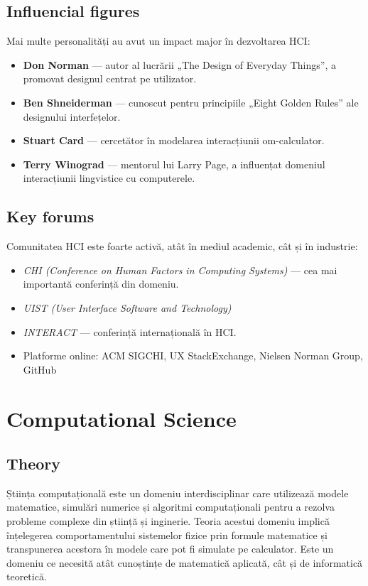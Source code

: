 \documentclass[12pt, letterpaper]{article}
\begin{document}
\subsection*{Influencial figures}
Mai multe personalități au avut un impact major în dezvoltarea HCI:
\begin{itemize}
    \item \textbf{Don Norman} — autor al lucrării „The Design of Everyday Things”, a promovat designul centrat pe utilizator.
    \item \textbf{Ben Shneiderman} — cunoscut pentru principiile „Eight Golden Rules” ale designului interfețelor.
    \item \textbf{Stuart Card} — cercetător în modelarea interacțiunii om-calculator.
    \item \textbf{Terry Winograd} — mentorul lui Larry Page, a influențat domeniul interacțiunii lingvistice cu computerele.
\end{itemize}

\subsection*{Key forums}
Comunitatea HCI este foarte activă, atât în mediul academic, cât și în industrie:
\begin{itemize}
    \item \textit{CHI (Conference on Human Factors in Computing Systems)} — cea mai importantă conferință din domeniu.
    \item \textit{UIST (User Interface Software and Technology)}
    \item \textit{INTERACT} — conferință internațională în HCI.
    \item Platforme online: ACM SIGCHI, UX StackExchange, Nielsen Norman Group, GitHub
\end{itemize}


\newpage
\section{Computational Science}

\subsection*{Theory}
Știința computațională este un domeniu interdisciplinar care utilizează modele matematice, simulări numerice și algoritmi computaționali pentru a rezolva probleme complexe din știință și inginerie. Teoria acestui domeniu implică înțelegerea comportamentului sistemelor fizice prin formule matematice și transpunerea acestora în modele care pot fi simulate pe calculator. Este un domeniu ce necesită atât cunoștințe de matematică aplicată, cât și de informatică teoretică.
\end{document}
